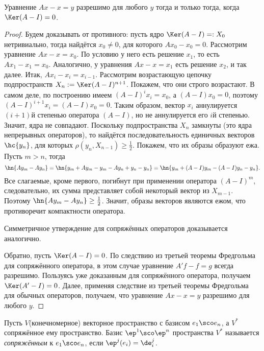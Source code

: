 \documentclass[a4paper]{article}
\begin{document}
\begin{theorem}
Уравнение $Ax-x = y$ разрешимо для любого $y$ тогда и только тогда, когда $\Ker(A-I) = 0$.
\end{theorem}
\begin{proof}
Будем доказывать от противного: пусть ядро $\Ker(A-I) =: X_0$ нетривиально, тогда
найдётся $x_0 \neq 0$, для которого $Ax_0 - x_0 = 0$. Рассмотрим уравнение $Ax -x = x_0$.
По условию у него есть решение $x_1$, то есть $Ax_1 - x_1 = x_0$. Аналогично, у уравнения
$Ax-x = x_1$ есть решение $x_2$, и так далее. Итак, $Ax_i - x_i = x_{i-1}$.
Рассмотрим возрастающую цепочку подпространств $X_n := \Ker(A-I)^{n+1}$.
Покажем, что они строго возрастают. В самом деле, по построению имеем $(A-I)^ix_i = x_0$,
а $(A-I)x_0 = 0$, поэтому $(A-I)^{i+1}x_i = (A-I)x_0 = 0$. Таким образом, вектор $x_i$
аннулируется $(i+1)$\д й степенью оператора $(A-I)$, но не аннулируется его $i$\д й степенью.
Значит, ядра не совпадают. Поскольку подпространства $X_n$ замкнуты (это ядра непрерывных операторов),
то найдётся последовательность единичных векторов $\hc{y_n}$, для которых $\rho(y_n, X_{n-1}) \ge \frac12$.
Покажем, что их образы образуют ежа. Пусть $m > n$, тогда
$$\hn{Ay_m - Ay_n} = \hn{y_m + Ay_m - y_m - Ay_n + y_n - y_n} = \hn{y_m + (A-I)y_m - (A-I)y_n - y_n}.$$
Все слагаемые, кроме первого, погибнут при применении оператора $(A-I)^m$, следовательно, их сумма
представляет собой некоторый вектор из $X_{m-1}$. Поэтому $\hn{Ay_m - Ay_n} \ge \frac12$. Значит,
образы векторов являются ежом, что противоречит компактности оператора.

Симметричное утверждение для сопряжённых операторов доказывается аналогично.

Обратно, пусть $\Ker(A-I)=0$. По следствию из третьей теоремы Фредгольма
для сопряжённого оператора, в этом случае уравнение $A'f-f = g$ всегда разрешимо.
Пользуясь уже доказанным  для сопряжённого оператора, получаем $\Ker(A'-I) = 0$.
Далее, применяя следствие из третьей теоремы Фредгольма для обычных операторов,
получаем, что уравнение $Ax -x = y$ разрешимо для любого $y$.
\end{proof}

\begin{df}
Пусть $V$\т (конечномерное) векторное пространство с базисом $e_1\sco e_n$,
а $V^*$\т сопряжённое ему пространство. Базис $\ep^1\sco \ep^n$ пространства $V^*$
называется \emph{сопряжённым} к $e_1\sco e_n$, если $\ep^j(e_i) = \de_i^j$.
\end{df}
\end{document}
